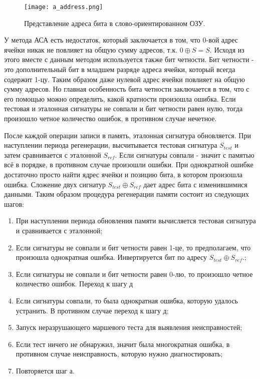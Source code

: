 \begin{figure}[ht]
\centering
  \texttt{[image: a\_address.png]}  
  \caption{ Представление адреса бита в слово-ориентированном ОЗУ.}
  \label{fig:arch_and_mod:memory_refresh:address}
\end{figure}

У метода АСА есть недостаток, который заключается в том, что 0-вой адрес ячейки никак не повлияет на общую сумму адресов, т.к. $0 \oplus S = S$. Исходя из этого вместе с данным методом используется также бит четности\cite{March_Tests_Ivaniuk}. Бит четности - это дополнительный бит в младшем разряде адреса ячейки, который всегда содержит 1-цу. Таким образом даже нулевой адрес ячейки повлияет на общую сумму адресов. Но главная особенность бита четности заключается в том, что с его помощью можно определить, какой кратности произошла ошибка. Если тестовая и эталонная сигнатуры не совпали и бит четности равен нулю, тогда произошло четное количество ошибок, в противном случае нечетное.

После каждой операции записи в память, эталонная сигнатура обновляется. При наступлении периода регенерации, высчитывается тестовая сигнатура $S_{test}$ и затем сравнивается с эталонной $S_{ref}$. Если сигнатуры совпали - значит с памятью всё в порядке, в противном случае произошли ошибки. При однократной ошибке достаточно просто найти ядрес ячейки и позицию бита, в котором произошла ошибка. Сложение двух сигнатур  $S_{test} \oplus S_{ref}$ дает адрес бита с изменившимися данными. Таким образом процедура регенерации памяти состоит из следующих шагов:
\begin{enumerate}
  \item При наступлении периода обновления памяти вычисляется тестовая сигнатура и сравнивается с эталонной;
  \item Если сигнатуры не совпали и бит четности равен 1-це, то предполагаем, что произошла однократная ошибка. Инвертируется бит по адресу $S_{test} \oplus S_{ref}$.;
  \item Если сигнатуры не совпали и бит четности равен 0-лю, то произошло четное количество ошибок. Переход к шагу д
  \item Если сигнатуры совпали, то была однократная ошибка, которую удалось устранить. В противном случае переход к шагу д;
  \item Запуск неразрушающего маршевого теста для выявления неисправностей;
  \item Если тест ничего не обнаружил, значит была многократная ошибка, в противном случае неисправность, которую нужно диагностировать;
  \item Повторяется шаг а.
\end{enumerate}


